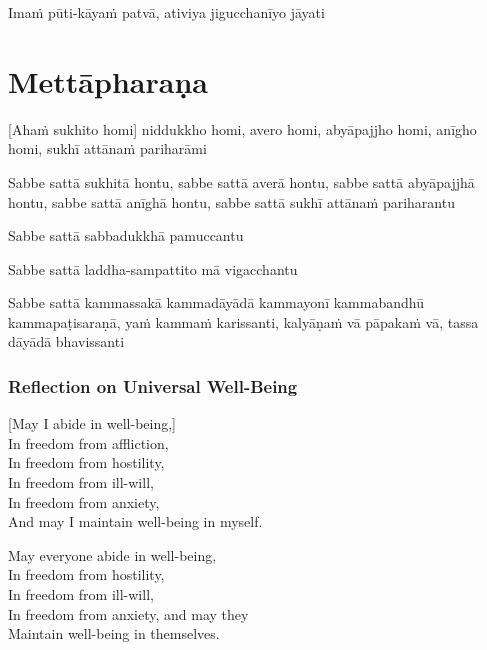 Imaṁ pūti-kāyaṁ patvā, ativiya jigucchanīyo jāyati


\section{Mettāpharaṇa}

\begin{leader}
\end{leader}


[Ahaṁ sukhito homi] niddukkho homi, avero homi, abyāpajjho homi, anīgho homi,
sukhī attānaṁ pariharāmi

Sabbe sattā sukhitā hontu, sabbe sattā averā hontu, sabbe sattā abyāpajjhā
hontu, sabbe sattā anīghā hontu, sabbe sattā sukhī attānaṁ pariharantu

Sabbe sattā sabbadukkhā pamuccantu

Sabbe sattā laddha-sampattito mā vigacchantu

Sabbe sattā kammassakā kammadāyādā kammayonī kammabandhū kammapaṭisaraṇā,
yaṁ kammaṁ karissanti, kalyāṇaṁ vā pāpakaṁ vā, tassa dāyādā bhavissanti


\subsubsection{Reflection on Universal Well-Being}

\begin{leader}
\end{leader}


[May I abide in well-being,]\\
In freedom from affliction,\\
In freedom from hostility,\\
In freedom from ill-will,\\
In freedom from anxiety,\\
And may I maintain well-being in myself.

May everyone abide in well-being,\\
In freedom from hostility,\\
In freedom from ill-will,\\
In freedom from anxiety, and may they\\
Maintain well-being in themselves.

